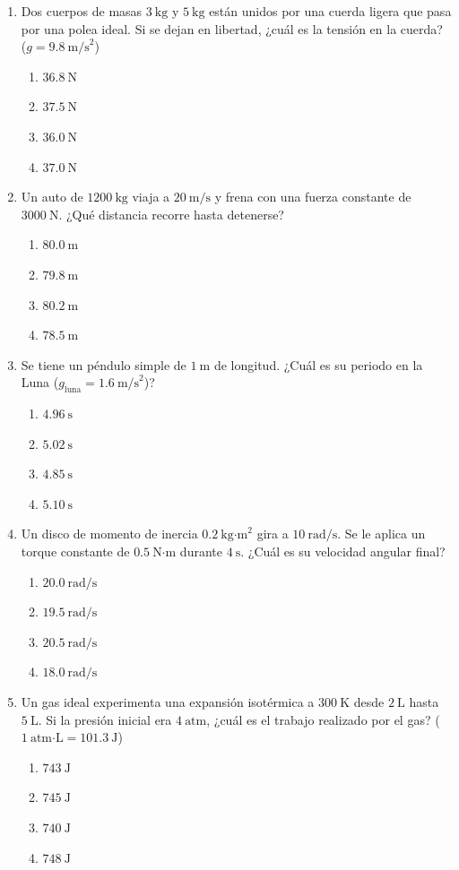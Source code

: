 \documentclass[12pt]{article}
\begin{document}
\begin{enumerate}
\item Dos cuerpos de masas $3\ \text{kg}$ y $5\ \text{kg}$ están unidos por una cuerda ligera que pasa por una polea ideal. Si se dejan en libertad, ¿cuál es la tensión en la cuerda? ($g = 9.8\ \text{m/s}^2$)
\begin{enumerate}[label=(\alph*)]
\item $36.8\ \text{N}$
\item $37.5\ \text{N}$
\item $36.0\ \text{N}$
\item $37.0\ \text{N}$
\end{enumerate}

\item Un auto de $1200\ \text{kg}$ viaja a $20\ \text{m/s}$ y frena con una fuerza constante de $3000\ \text{N}$. ¿Qué distancia recorre hasta detenerse?
\begin{enumerate}[label=(\alph*)]
\item $80.0\ \text{m}$
\item $79.8\ \text{m}$
\item $80.2\ \text{m}$
\item $78.5\ \text{m}$
\end{enumerate}

\item Se tiene un péndulo simple de $1\ \text{m}$ de longitud. ¿Cuál es su periodo en la Luna ($g_{\text{luna}} = 1.6\ \text{m/s}^2$)?
\begin{enumerate}[label=(\alph*)]
\item $4.96\ \text{s}$
\item $5.02\ \text{s}$
\item $4.85\ \text{s}$
\item $5.10\ \text{s}$
\end{enumerate}

\item Un disco de momento de inercia $0.2\ \text{kg·m}^2$ gira a $10\ \text{rad/s}$. Se le aplica un torque constante de $0.5\ \text{N·m}$ durante $4\ \text{s}$. ¿Cuál es su velocidad angular final?
\begin{enumerate}[label=(\alph*)]
\item $20.0\ \text{rad/s}$
\item $19.5\ \text{rad/s}$
\item $20.5\ \text{rad/s}$
\item $18.0\ \text{rad/s}$
\end{enumerate}

\item Un gas ideal experimenta una expansión isotérmica a $300\ \text{K}$ desde $2\ \text{L}$ hasta $5\ \text{L}$. Si la presión inicial era $4\ \text{atm}$, ¿cuál es el trabajo realizado por el gas? ($1\ \text{atm·L} = 101.3\ \text{J}$)
\begin{enumerate}[label=(\alph*)]
\item $743\ \text{J}$
\item $745\ \text{J}$
\item $740\ \text{J}$
\item $748\ \text{J}$
\end{enumerate}


\end{enumerate}
\end{document}
